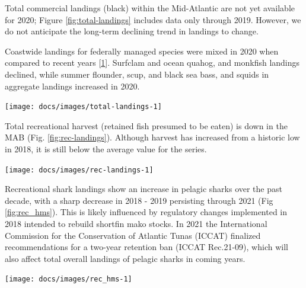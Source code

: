 \documentclass[
  10pt,
]{article}
\let\origfigure\figure
\let\endorigfigure\endfigure
\renewenvironment{figure}[1][2] {
    \expandafter\origfigure\expandafter[H]
} {
    \endorigfigure
}
\begin{document}
Total commercial landings (black) within the Mid-Atlantic are not yet
available for 2020; Figure \ref{fig:total-landings} includes data only
through 2019. However, we do not anticipate the long-term declining
trend in landings to change.

Coastwide landings for federally managed species were mixed in 2020 when
compared to recent years
{[}\protect\hyperlink{ref-thunberg_northeast_2021}{1}{]}. Surfclam and
ocean quahog, and monkfish landings declined, while summer flounder,
scup, and black sea bass, and squids in aggregate landings increased in
2020.

\begin{figure}

{\centering \texttt{[image: docs/images/total-landings-1]} 

}

\caption{Total commercial seafood landings through 2019 (black) and Mid-Atlantic managed seafood landings (red).}\label{fig:total-landings}
\end{figure}

Total recreational harvest (retained fish presumed to be eaten) is down
in the MAB (Fig. \ref{fig:rec-landings}). Although harvest has increased
from a historic low in 2018, it is still below the average value for the
series.

\begin{figure}

{\centering \texttt{[image: docs/images/rec-landings-1]} 

}

\caption{Total recreational seafood harvest (millions of fish) in the Mid-Atlantic region.}\label{fig:rec-landings}
\end{figure}

Recreational shark landings show an increase in pelagic sharks over the
past decade, with a sharp decrease in 2018 - 2019 persisting through
2021 (Fig \ref{fig:rec_hms}). This is likely influenced by regulatory
changes implemented in 2018 intended to rebuild shortfin mako stocks. In
2021 the International Commission for the Conservation of Atlantic Tunas
(ICCAT) finalized recommendations for a two-year retention ban (ICCAT
Rec.21-09), which will also affect total overall landings of pelagic
sharks in coming years.

\begin{figure}

{\centering \texttt{[image: docs/images/rec\_hms-1]} 

}

\caption{Recreational shark landings from Marine Recreational Information Program.}\label{fig:rec_hms}
\end{figure}
\end{document}
